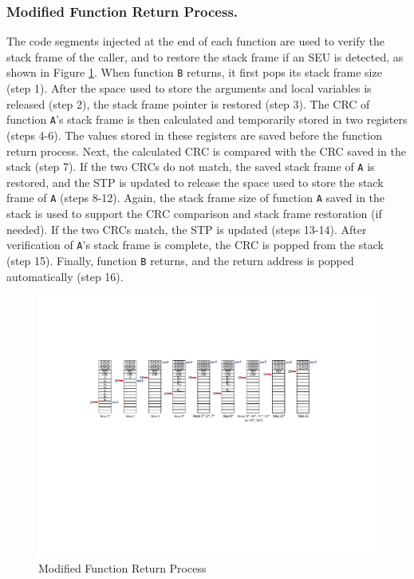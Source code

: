 \subsubsection{Modified Function Return Process.}
The code segments injected at the end of each function are used to verify the stack frame of the caller, and to restore the stack frame if an SEU is detected, as shown in Figure \ref{fig:modified_function_operation_post_execution}. When function \texttt{B} returns, it first pops its stack frame size (step 1). After the space used to store the arguments and local variables is released (step 2), the stack frame pointer is restored (step 3). The CRC of function \texttt{A}'s stack frame is then calculated and temporarily stored in two registers (steps 4-6). The values stored in these registers are saved before the function return process. Next, the calculated CRC is compared with the CRC saved in the stack (step 7). If the two CRCs do not match, the saved stack frame of \texttt{A} is restored, and the STP is updated to release the space used to store the stack frame of \texttt{A} (steps 8-12). Again, the stack frame size of function \texttt{A} saved in the stack is used to support the CRC comparison and stack frame restoration (if needed). If the two CRCs match, the STP is updated (steps 13-14). After verification of \texttt{A}'s stack frame is complete, the CRC is popped from the stack (step 15). Finally, function \texttt{B} returns, and the return address is popped automatically (step 16).
\begin{figure}
	\centering
	\includegraphics[width=1.0\textwidth]{figures/modified_function_operations_stack_post_execution_v3}
	\vspace{-15pt}
	\caption{Modified Function Return Process}\label{fig:modified_function_operation_post_execution}
\end{figure}